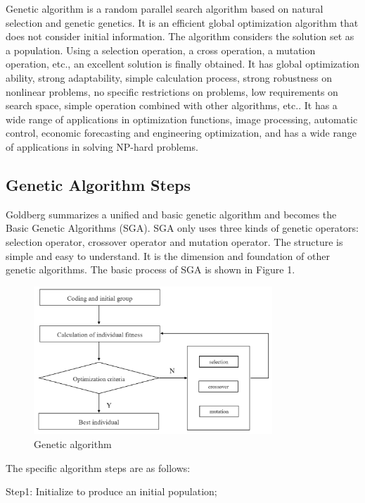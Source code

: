 \documentclass[12pt]{article}
\begin{document}
Genetic algorithm is a random parallel search algorithm based on natural selection and genetic genetics. 
It is an efficient global optimization algorithm that does not consider initial information. 
The algorithm considers the solution set as a population. 
Using a selection operation, a cross operation, a mutation operation, etc., 
an excellent solution is finally obtained.
It has global optimization ability, strong adaptability, simple calculation process, strong robustness on nonlinear problems, no specific restrictions on problems, low requirements on search space, simple operation combined with other algorithms, etc.. 
It has a wide range of applications in optimization functions, image processing, automatic control, economic forecasting and engineering optimization, and has a wide range of applications in solving NP-hard problems.

\subsection{Genetic Algorithm Steps}
Goldberg summarizes a unified and basic genetic algorithm and becomes the Basic Genetic Algorithms (SGA). 
SGA only uses three kinds of genetic operators: selection operator, crossover operator and mutation operator. 
The structure is simple and easy to understand. 
It is the dimension and foundation of other genetic algorithms.
The basic process of SGA is shown in Figure 1.

\begin{figure}[h]
    \centering
    \includegraphics[width=0.8\textwidth]{process.png}
    \caption{Genetic algorithm}
\end{figure}

The specific algorithm steps are as follows:

Step1: Initialize to produce an initial population;
\end{document}
